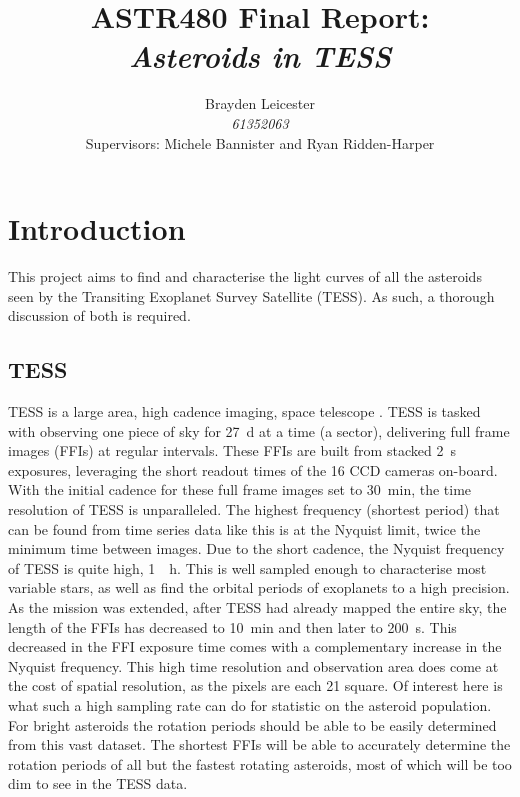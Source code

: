 \documentclass[12pt]{article}
\title{ASTR480 Final Report:\\
\textit{Asteroids in TESS}
}
\author{Brayden Leicester \\ 
\textit{61352063} \\
[1ex]\small{Supervisors: Michele Bannister and Ryan Ridden-Harper}
}
\begin{document}
\maketitle




\newpage
{}

\section{Introduction}\label{Sec:Intro}

This project aims to find and characterise the light curves of all the asteroids seen by the Transiting Exoplanet Survey Satellite (TESS).
As such, a thorough discussion of both is required.


\subsection{TESS}\label{SubSec:TESS}

TESS is a large area, high cadence imaging, space telescope  \citep{Ricker2014}.
TESS is tasked with observing one piece of sky for \qty{27}{\day} at a time (a sector), delivering  full frame images (FFIs) at regular intervals.
These FFIs are built from stacked \qty{2}{\second} exposures, leveraging the short readout times of the 16 CCD cameras on-board.
With the initial cadence for these full frame images set to \qty{30}{\minute}, the time resolution of TESS is unparalleled.
The highest frequency (shortest period) that can be found from time series data like this is at the Nyquist limit, twice the minimum time between images.
Due to the short cadence, the Nyquist frequency of TESS is quite high, \qty{1}{\per\hour}.
This is well sampled enough to characterise most variable stars, as well as find the orbital periods of exoplanets to a high precision.
As the mission was extended, after TESS had already mapped the entire sky, the length of the FFIs has decreased to \qty{10}{\minute} and then later to \qty{200}{\second}.
This decreased in the FFI exposure time comes with a complementary increase in the Nyquist frequency.
This high time resolution and observation area does come at the cost of spatial resolution, as the pixels are each \qty{21}{\arcsec} square.
Of interest here is what such a high sampling rate can do for statistic on the asteroid population.
For bright asteroids the rotation periods should be able to be easily determined from this vast dataset.
The shortest FFIs will be able to accurately determine the rotation periods of all but the fastest rotating asteroids, most of which will be too dim to see in the TESS data.
\end{document}

